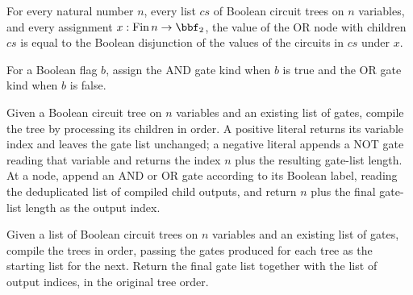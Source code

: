 \begin{theorem}
\label{BoolCircuit.TreeCircuit.eval_node_false}
\leanok
{}
For every natural number $n$, every list $cs$ of Boolean circuit trees on $n$ variables,
and every assignment $x : \mathrm{Fin}\,n \to \bbf_2$, the value of the OR node with
children $cs$ is equal to the Boolean disjunction of the values of the circuits in $cs$
under $x$.
\end{theorem}

\begin{definition}
\label{BoolCircuit.nodeKind}
\leanok
{}
For a Boolean flag $b$, assign the AND gate kind when $b$ is true and the OR gate kind
when $b$ is false.
\end{definition}

\begin{definition}
\label{BoolCircuit.compileTree}
\leanok
{}
Given a Boolean circuit tree on $n$ variables and an existing list of gates, compile the
tree by processing its children in order. A positive literal returns its variable index
and leaves the gate list unchanged; a negative literal appends a NOT gate reading that
variable and returns the index $n$ plus the resulting gate-list length. At a node,
append an AND or OR gate according to its Boolean label, reading the deduplicated list
of compiled child outputs, and return $n$ plus the final gate-list length as the output
index.
\end{definition}

\begin{definition}
\label{BoolCircuit.compileTrees}
\leanok
{}
Given a list of Boolean circuit trees on $n$ variables and an existing list of gates,
compile the trees in order, passing the gates produced for each tree as the starting
list for the next. Return the final gate list together with the list of output indices,
in the original tree order.
\end{definition}

